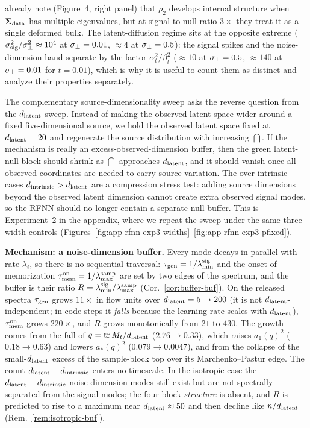 \citet{bonnaire2025} already note (Figure~4, right panel) that $\rho_2$ develops internal structure when $\bm{\Sigma}_{\mathrm{data}}$ has multiple eigenvalues, but at signal-to-null ratio $3{\times}$ they treat it as a single deformed bulk. The latent-diffusion regime sits at the opposite extreme ($\sigma_{\mathrm{sig}}^2/\sigma_{\perp}^2 \approx 10^4$ at $\sigma_{\perp} = 0.01$, $\approx 4$ at $\sigma_{\perp} = 0.5$): the signal spikes and the noise-dimension band separate by the factor $\alpha_t^2/\beta_t^2$ ($\approx10$ at $\sigma_{\perp}=0.5$, $\approx140$ at $\sigma_{\perp}=0.01$ for $t=0.01$), which is why it is useful to count them as distinct and analyze their properties separately.

The complementary source-dimensionality sweep asks the reverse question from the $d_{\mathrm{latent}}$ sweep. Instead of making the observed latent space wider around a fixed five-dimensional source, we hold the observed latent space fixed at $d_{\mathrm{latent}}=20$ and regenerate the source distribution with increasing $\dint$. If the mechanism is really an excess-observed-dimension buffer, then the green latent-null block should shrink as $\dint$ approaches $d_{\mathrm{latent}}$, and it should vanish once all observed coordinates are needed to carry source variation. The over-intrinsic cases $d_{\mathrm{intrinsic}}>d_{\mathrm{latent}}$ are a compression stress test: adding source dimensions beyond the observed latent dimension cannot create extra observed signal modes, so the RFNN should no longer contain a separate null buffer. This is Experiment~2 in the appendix, where we repeat the sweep under the same three width controls (Figures~\ref{fig:app-rfnn-exp3-widths}--\ref{fig:app-rfnn-exp3-pfixed}).

\textbf{Mechanism: a noise-dimension buffer.}
Every mode decays in parallel with rate $\lambda_i$, so there is no sequential traversal: $\tau_{\mathrm{gen}}=1/\lambda^{\rm sig}_{\min}$ and the onset of memorization $\tau_{\mathrm{mem}}^{\rm on}=1/\lambda^{\rm samp}_{\max}$ are set by two edges of the spectrum, and the buffer is their ratio $R=\lambda^{\rm sig}_{\min}/\lambda^{\rm samp}_{\max}$ (Cor.~\ref{cor:buffer-buf}). On the released spectra $\tau_{\mathrm{gen}}$ grows $11\times$ in flow units over $d_{\mathrm{latent}}=5\to200$ (it is not $d_{\mathrm{latent}}$-independent; in code steps it \emph{falls} because the learning rate scales with $d_{\mathrm{latent}}$), $\tau_{\mathrm{mem}}^{\rm on}$ grows $220\times$, and $R$ grows monotonically from $21$ to $430$. The growth comes from the fall of $q=\operatorname{tr}M_t/d_{\mathrm{latent}}$ ($2.76\to0.33$), which raises $a_1(q)^2$ ($0.18\to0.63$) and lowers $a_*(q)^2$ ($0.079\to0.0047$), and from the collapse of the small-$d_{\mathrm{latent}}$ excess of the sample-block top over its Marchenko--Pastur edge. The count $d_{\mathrm{latent}}-d_{\mathrm{intrinsic}}$ enters no timescale. In the isotropic case the $d_{\mathrm{latent}}-d_{\mathrm{intrinsic}}$ noise-dimension modes still exist but are not spectrally separated from the signal modes; the four-block \emph{structure} is absent, and $R$ is predicted to rise to a maximum near $d_{\mathrm{latent}}\approx50$ and then decline like $n/d_{\mathrm{latent}}$ (Rem.~\ref{rem:isotropic-buf}).

